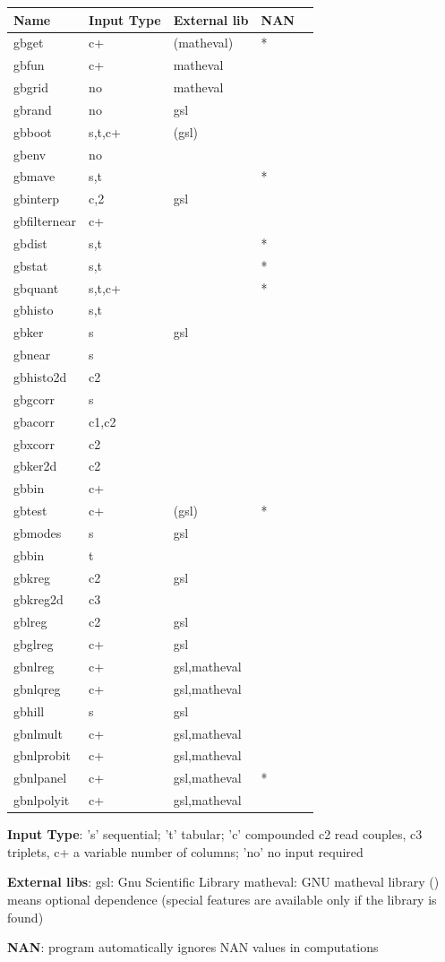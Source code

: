 \documentclass[11pt]{article}
\begin{document}
\begin{center}
\begin{tabular}{lllll}
Name & Input Type & External lib & NAN & \\
\hline
gbget & c+ & (matheval) & * & \\
gbfun & c+ & matheval &  & \\
gbgrid & no & matheval &  & \\
gbrand & no & gsl &  & \\
gbboot & s,t,c+ & (gsl) &  & \\
gbenv & no &  &  & \\
gbmave & s,t &  & * & \\
gbinterp & c,2 & gsl &  & \\
gbfilternear & c+ &  &  & \\
gbdist & s,t &  & * & \\
gbstat & s,t &  & * & \\
gbquant & s,t,c+ &  & * & \\
gbhisto & s,t &  &  & \\
gbker & s & gsl &  & \\
gbnear & s &  &  & \\
gbhisto2d & c2 &  &  & \\
gbgcorr & s &  &  & \\
gbacorr & c1,c2 &  &  & \\
gbxcorr & c2 &  &  & \\
gbker2d & c2 &  &  & \\
gbbin & c+ &  &  & \\
gbtest & c+ & (gsl) & * & \\
gbmodes & s & gsl &  & \\
gbbin & t &  &  & \\
gbkreg & c2 & gsl &  & \\
gbkreg2d & c3 &  &  & \\
gblreg & c2 & gsl &  & \\
gbglreg & c+ & gsl &  & \\
gbnlreg & c+ & gsl,matheval &  & \\
gbnlqreg & c+ & gsl,matheval &  & \\
gbhill & s & gsl &  & \\
gbnlmult & c+ & gsl,matheval &  & \\
gbnlprobit & c+ & gsl,matheval &  & \\
gbnlpanel & c+ & gsl,matheval & * & \\
gbnlpolyit & c+ & gsl,matheval &  & \\
\end{tabular}
\end{center}


\textbf{Input Type}: 's' sequential; 't' tabular; 'c' compounded c2 read
couples, c3 triplets, c+ a variable number of columns; 'no' no input
required

\textbf{External libs}: gsl: Gnu Scientific Library matheval: GNU matheval
library () means optional dependence (special features are available
only if the library is found)

\textbf{NAN}: program automatically ignores NAN values in computations
\end{document}
